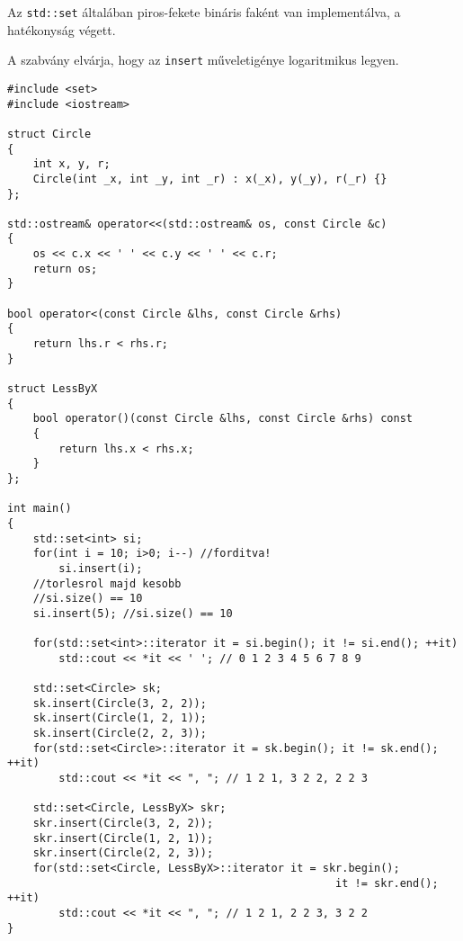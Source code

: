 \documentclass[a4paper,11.5pt]{article}
\begin{document}
	Az \texttt{std::set} általában piros-fekete bináris faként van implementálva, a hatékonyság végett.
	\begin{note}
		A szabvány elvárja, hogy az \texttt{insert} műveletigénye logaritmikus legyen.
	\end{note}
	\begin{lstlisting}
#include <set>
#include <iostream>

struct Circle
{
	int x, y, r;
	Circle(int _x, int _y, int _r) : x(_x), y(_y), r(_r) {}
};

std::ostream& operator<<(std::ostream& os, const Circle &c)
{
	os << c.x << ' ' << c.y << ' ' << c.r;
	return os;
}

bool operator<(const Circle &lhs, const Circle &rhs)
{
	return lhs.r < rhs.r;
}

struct LessByX
{
	bool operator()(const Circle &lhs, const Circle &rhs) const
	{
		return lhs.x < rhs.x;
	}
};

int main()
{
	std::set<int> si;
	for(int i = 10; i>0; i--) //forditva!
		si.insert(i);
	//torlesrol majd kesobb
	//si.size() == 10
	si.insert(5); //si.size() == 10
	
	for(std::set<int>::iterator it = si.begin(); it != si.end(); ++it)
		std::cout << *it << ' '; // 0 1 2 3 4 5 6 7 8 9
	
	std::set<Circle> sk;
	sk.insert(Circle(3, 2, 2));
	sk.insert(Circle(1, 2, 1));
	sk.insert(Circle(2, 2, 3));
	for(std::set<Circle>::iterator it = sk.begin(); it != sk.end(); ++it)
		std::cout << *it << ", "; // 1 2 1, 3 2 2, 2 2 3
	
	std::set<Circle, LessByX> skr;
	skr.insert(Circle(3, 2, 2));
	skr.insert(Circle(1, 2, 1));
	skr.insert(Circle(2, 2, 3));
	for(std::set<Circle, LessByX>::iterator it = skr.begin(); 
												   it != skr.end(); ++it)
		std::cout << *it << ", "; // 1 2 1, 2 2 3, 3 2 2
}	
	\end{lstlisting}
\end{document}
